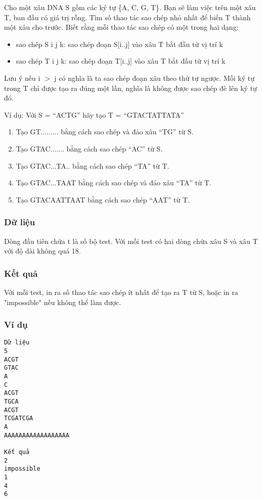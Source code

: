 



   Cho một xâu DNA S gồm các ký tự \{A, C, G, T\}. Bạn sẽ làm việc trên một xâu T, ban đầu có giá trị rỗng. Tìm số thao tác sao chép nhỏ nhất để biến T thành một xâu cho trước. Biết rằng mỗi thao tác sao chép có một trong hai dạng:  
\begin{itemize}
	\item     sao chép S i j k: sao chép đoạn S[i..j] vào xâu T bắt đầu từ vị trí k   
	\item     sao chép T i j k: sao chép đoạn T[i..j] vào xâu T bắt đầu từ vị trí k   
\end{itemize}

   Lưu ý nếu i $>$ j có nghĩa là ta sao chép đoạn xâu theo thứ tự ngược. Mỗi ký tự trong T chỉ được tạo ra đúng một lần, nghĩa là không được sao chép đè lên ký tự đó.  

   Ví dụ: Với S = “ACTG” hãy tạo T = “GTACTATTATA”  
\begin{enumerate}
	\item     Tạo GT......... bằng cách sao chép và đảo xâu “TG” từ S.   
	\item     Tạo GTAC....... bằng cách sao chép “AC” từ S.   
	\item     Tạo GTAC...TA.. bằng cách sao chép “TA” từ T.   
	\item     Tạo GTAC...TAAT bằng cách sao chép và đảo xâu “TA” từ T.   
	\item     Tạo GTACAATTAAT bằng cách sao chép “AAT” từ T.   
\end{enumerate}

\subsubsection{   Dữ liệu  }

   Dòng đầu tiên chứa t là số bộ test. Với mỗi test có hai dòng chứa xâu S và xâu T với độ dài không quá 18.  

\subsubsection{   Kết quả  }

   Với mỗi test, in ra số thao tác sao chép ít nhất để tạo ra T từ S, hoặc in ra "impossible" nếu không thể làm được.  

\subsubsection{   Ví dụ  }
\begin{verbatim}
Dữ liệu
5
ACGT
GTAC
A
C
ACGT
TGCA
ACGT
TCGATCGA
A
AAAAAAAAAAAAAAAAAA

Kết quả
2
impossible
1
4
6
\end{verbatim}